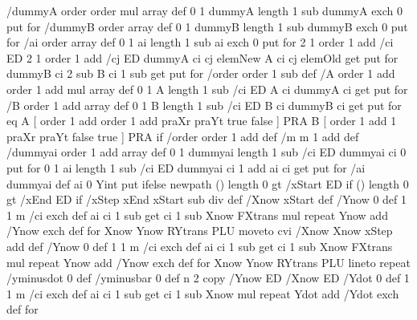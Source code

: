 {{    /dummyA order order mul array def                    
    0 1 dummyA length 1 sub { dummyA exch 0 put } for  
    /dummyB order array def
    0 1 dummyB length 1 sub { dummyB exch 0 put } for
    /ai order array def
    0 1 ai length 1 sub { ai exch 0 put } for
    2 1 order 1 add {/ci ED
      2 1 order 1 add {/cj ED
        dummyA ci cj elemNew
        A ci cj elemOld get
        put
      } for
      dummyB ci 2 sub
      B ci 1 sub get
      put
    } for
  /order order 1 sub def                                             %
  /A order 1 add order 1 add mul array def 0 1 A length 1 sub {/ci ED A ci dummyA ci get put } for  %
  /B order 1 add array def 0 1 B length 1 sub {/ci ED B ci dummyB ci get put } for                  %
  \Pst@Debug{} eq {
  A [ order 1 add order 1 add praXr praYt \psk@MaScale\space true false ] PRA
  B [ order 1 add 1 praXr praYt \psk@MaScale\space false true ] PRA } if
  \tx@GaussSolve
  /order order 1 add def                                             %
  /m m 1 add def
  /dummyai order 1 add array def
  0 1 dummyai length 1 sub {/ci ED dummyai ci 0 put } for
  0 1 ai length 1 sub {/ci ED dummyai ci 1 add ai ci get put } for
  /ai dummyai def
  ai 0 Yint put
  }{ \tx@GaussSolve } ifelse
  newpath
  (\psk@xStart) length 0 gt             %
  { \psk@xStart\space /xStart ED } if 
  (\psk@xEnd) length 0 gt             %
  { \psk@xEnd\space /xEnd ED } if
  /xStep xEnd xStart sub \psk@plotpoints\space div def
  /Xnow xStart def
  /Ynow 0 def
  1 1 m { /ci exch def ai ci 1 sub get ci 1 sub { Xnow FXtrans mul } repeat Ynow add /Ynow exch def } for
  Xnow Ynow RYtrans PLU moveto
  \psk@plotpoints\space cvi
  { /Xnow Xnow xStep add def
  /Ynow 0 def
  1 1 m { /ci exch def ai ci 1 sub get ci 1 sub { Xnow FXtrans mul } repeat Ynow add /Ynow exch def } for
  Xnow Ynow RYtrans PLU lineto
  } repeat
  /yminusdot 0 def
  /yminusbar 0 def
  n {
    2 copy
    /Ynow ED
    /Xnow ED
    /Ydot 0 def
    1 1 m { /ci exch def
     ai ci 1 sub get ci 1 sub { Xnow mul } repeat Ydot add /Ydot exch def } for %
}}
